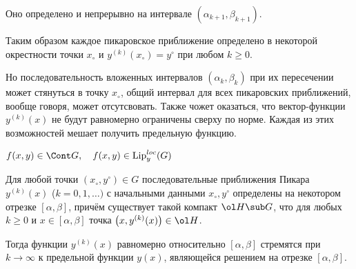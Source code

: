 Оно определено и непрерывно на интервале $ (\alpha_{k + 1}, \beta_{k + 1}) $.

Таким образом каждое пикаровское приближение определено в некоторой окрестности точки $ x_\circ $ и $ y^{(k)}(x_\circ) = y^\circ $ при любом $ k \ge 0 $.

Но последовательность вложенных интервалов $ (\alpha_k, \beta_k) $ при их пересечении может стянуться в точку $ x_\circ $, \ie общий интервал для всех пикаровских приближений, вообще говоря, может отсутсвовать. Также чожет оказаться, что вектор-функции $ y^{(k)}(x) $ не будут равномерно ограничены сверху по норме. Каждая из этих возможностей мешает получить предельную функцию.

\begin{theorem}[Пикара]
    $ f(x, y) \in \Cont G, \quad f(x, y) \in \operatorname{Lip}_y^{loc}(G) $

    Для любой точки $ (x_\circ, y^\circ) \in G $ последовательные приближения Пикара $ y^{(k)}(x) $ ($ k = 0, 1, \dots) $ с начальными данными $ x_\circ, y^\circ $ определены на некотором отрезке $ [\alpha, \beta] $, причём существует такой компакт $ \ol H \sub G $, что для любых $ k \ge 0 $ и $ x \in [\alpha, \beta] $ точка $ \big( x, y^{(k)}(x) \big) \in \ol H $.

    Тогда функции $ y^{(k)}(x) $ равномерно относительно $ [\alpha, \beta] $ стремятся при $ k \to \infty $ к предельной функции $ y(x) $, являющейся решением  на отрезке $ [\alpha, \beta] $.
\end{theorem}

